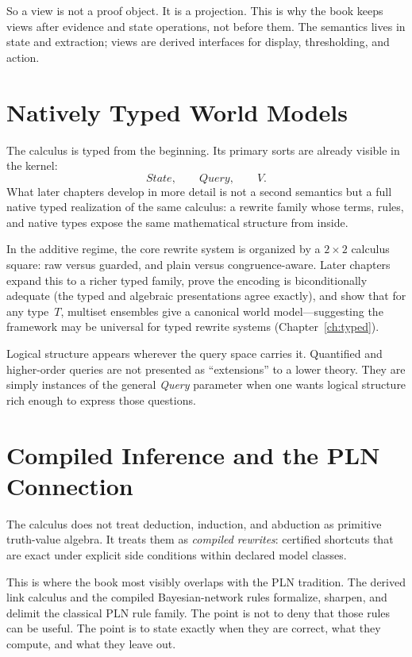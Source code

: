 \documentclass[11pt,openany]{report}
\begin{document}
So a view is not a proof object.  It is a projection.  This is why the book keeps
views after evidence and state operations, not before them.  The semantics lives
in state and extraction; views are derived interfaces for display, thresholding,
and action.

\section{Natively Typed World Models}
\label{sec:overview-typed}

The calculus is typed from the beginning.  Its primary sorts are already
visible in the kernel:
\[
  \textit{State}, \qquad \textit{Query}, \qquad V.
\]
What later chapters develop in more detail is not a second semantics but a
full native typed realization of the same calculus: a rewrite family whose
terms, rules, and native types expose the same mathematical structure from
inside.

In the additive regime, the core rewrite system is organized by a
$2 \times 2$ calculus square: raw versus guarded, and plain versus
congruence-aware.  Later chapters expand this to a richer typed
family, prove the encoding is biconditionally adequate (the typed
and algebraic presentations agree exactly), and show that for any
type~$T$, multiset ensembles give a canonical world
model---suggesting the framework may be universal for typed
rewrite systems (Chapter~\ref{ch:typed}).

Logical structure appears wherever the query space carries it.  Quantified and
higher-order queries are not presented as ``extensions'' to a lower theory.
They are simply instances of the general \textit{Query} parameter when one wants
logical structure rich enough to express those questions.

\section{Compiled Inference and the PLN Connection}
\label{sec:overview-compiled}

The calculus does not treat deduction, induction, and abduction as primitive
truth-value algebra.  It treats them as \emph{compiled rewrites}: certified
shortcuts that are exact under explicit side conditions within declared model
classes.

This is where the book most visibly overlaps with the PLN tradition.  The
derived link calculus and the compiled Bayesian-network rules formalize,
sharpen, and delimit the classical PLN rule family.  The point is not to deny
that those rules can be useful.  The point is to state exactly when they are
correct, what they compute, and what they leave out.
\end{document}
